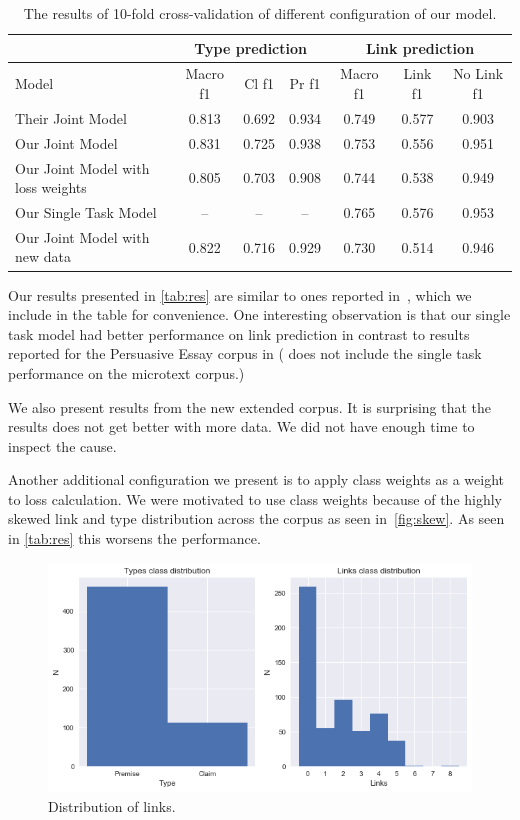 \documentclass[onecolumn]{article}
\begin{document}
\begin{table}[h]
    \centering
    \begin{tabular}{| l || c | c | c | c | c | c |}
        \hline
        & \multicolumn{3}{|c|}{Type prediction} & \multicolumn{3}{|c|}{Link prediction} \\ 
        \hline
        Model & Macro f1 & Cl f1 & Pr f1 & Macro f1 & Link f1 & No Link f1 \\
        \hline
        Their Joint Model                 & 0.813 & 0.692 & 0.934 & 0.749 & 0.577 & 0.903 \\
        Our Joint Model                   & 0.831 & 0.725 & 0.938 & 0.753 & 0.556 & 0.951 \\
        Our Joint Model with loss weights & 0.805 & 0.703 & 0.908 & 0.744 & 0.538 & 0.949 \\
        Our Single Task Model             &   –   &   –   &   –   & 0.765 & 0.576 & 0.953 \\
        Our Joint Model with new data     & 0.822 & 0.716 & 0.929 & 0.730 & 0.514 & 0.946 \\
        \hline
    \end{tabular}
    \caption{The results of 10-fold cross-validation of different configuration of our model.}\label{tab:res}
\end{table}

Our results presented in \autoref{tab:res} are similar to ones reported in~\cite{potash2017here}, which we include in the table for convenience.
One interesting observation is that our single task model had better performance on link prediction in contrast to results reported for the Persuasive Essay corpus in \cite{potash2017here}
(\cite{potash2017here} does not include the single task performance on the microtext corpus.)

We also present results from the new extended corpus.
It is surprising that the results does not get better with more data.
We did not have enough time to inspect the cause.

Another additional configuration we present is to apply class weights as a weight to loss calculation.
We were motivated to use class weights because of the highly skewed link and type distribution across the corpus as seen in~\autoref{fig:skew}.
As seen in \autoref{tab:res} this worsens the performance.

\begin{figure}[h]
    \centering
    \includegraphics[width=0.6\linewidth]{fig/dist.png}
    \caption{Distribution of links.}\label{fig:skew}
\end{figure}
\end{document}
